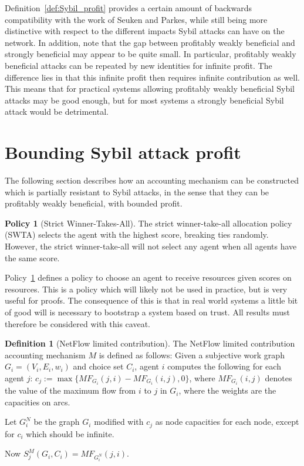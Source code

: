 \documentclass[a4paper,11pt]{book}
\theoremstyle{definition}
\newtheorem{definition}{Definition}
\newtheorem{policy}{Policy}
\begin{document}
Definition~\ref{def:Sybil_profit} provides a certain amount of backwards compatibility with the work
of Seuken and Parkes, while still being more distinctive with respect to the different impacts
Sybil attacks can have on the network. In addition, note that the gap between profitably weakly
beneficial and strongly beneficial may appear to be quite small. In particular, profitably weakly beneficial
attacks can be repeated by new identities for infinite profit. The difference lies in that
this infinite profit then requires infinite contribution as well. This means that for practical systems
allowing profitably weakly beneficial Sybil attacks may be good enough, but for most systems a 
strongly beneficial Sybil attack would be detrimental.

\section{Bounding Sybil attack profit}

The following section describes how an accounting mechanism can be constructed which is partially
resistant to Sybil attacks, in the sense that they can be profitably weakly beneficial, with bounded
profit.

\begin{policy}[Strict Winner-Takes-All]
   \label{def:SWTA}
   The strict winner-take-all allocation policy (SWTA) selects the agent with the highest score,
   breaking ties randomly. However, the strict winner-take-all will not select any agent
   when all agents have the same score.
\end{policy}

Policy~\ref{def:SWTA} defines a policy to choose an agent to receive resources given scores
on resources. This is a policy which will likely not be used in practice, but is very useful
for proofs. The consequence of this is that in real world systems a little bit of good will
is necessary to bootstrap a system based on trust. All results must therefore be considered
with this caveat. 

\begin{definition}[NetFlow limited contribution]
    The NetFlow limited contribution accounting mechanism $M$ is defined as follows:
    Given a subjective work graph $G_i = (V_i, E_i, w_i)$ and choice set $C_i$, agent
    $i$ computes the following for each agent $j$: 
    $c_j := \max\{MF_{G_i}(j,i) - MF_{G_i}(i,j), 0\}$, where $MF_{G_i}(i,j)$ denotes
    the value of the maximum flow from $i$ to $j$ in $G_i$, where the weights are
    the capacities on arcs.

    Let $G_i^N$ be the graph $G_i$ modified with $c_j$ as node capacities for each node,
    except for $c_i$ which should be infinite.

    Now $S^M_j(G_i, C_i) = MF_{G_i^N}(j, i)$.
\end{definition}
\end{document}
